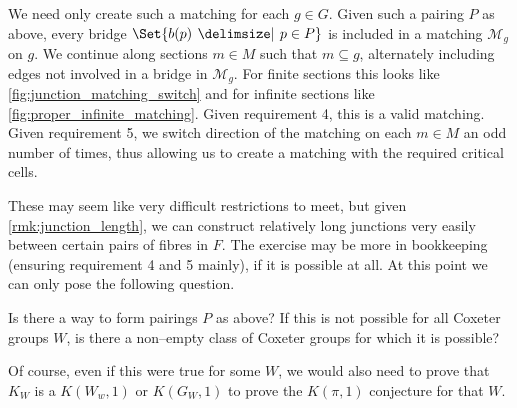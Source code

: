\documentclass[class=article, crop=false]{standalone}
\begin{document}
We need only create such a matching for each $g \in G$. Given such a pairing $P$ as above, every bridge $\Set{b(p) \given p \in P}$ is included in a matching $\mathcal{M}_g$ on $g$. We continue along sections $m \in M$ such that $m \subseteq g$, alternately including edges not involved in a bridge in $\mathcal{M}_g$. For finite sections this looks like \cref{fig:junction_matching_switch} and for infinite sections like \cref{fig:proper_infinite_matching}. Given requirement 4, this is a valid matching. Given requirement 5, we switch direction of the matching on each $m \in M$ an odd number of times, thus allowing us to create a matching with the required critical cells.

These may seem like very difficult restrictions to meet, but given \cref{rmk:junction_length}, we can construct relatively long junctions very easily between certain pairs of fibres in $F$. The exercise may be more in bookkeeping (ensuring requirement 4 and 5 mainly), if it is possible at all. At this point we can only pose the following question.

\begin{question}
    Is there a way to form pairings $P$ as above? If this is not possible for all Coxeter groups $W$, is there a non--empty class of Coxeter groups for which it is possible?
\end{question}

Of course, even if this were true for some $W$, we would also need to prove that $K_W$ is a $K(W_w,1)$ or $K(G_W,1)$ to prove the $K(\pi,1)$ conjecture for that $W$.
\end{document}
